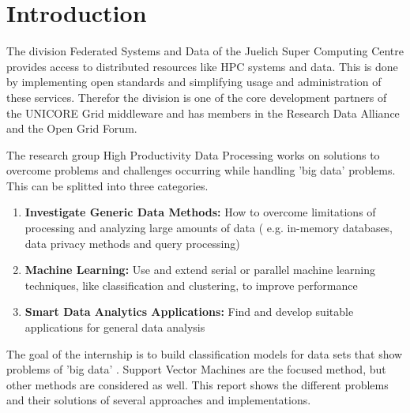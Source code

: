 %

\section{Introduction}

The division Federated Systems and Data of the Juelich Super Computing
Centre provides access to distributed resources like HPC systems and
data. This is done by implementing open standards and simplifying
usage and administration of these services. Therefor the division
is one of the core development partners of the UNICORE Grid middleware
and has members in the Research Data Alliance and the Open Grid Forum.

The research group High Productivity Data Processing works on solutions
to overcome problems and challenges occurring while handling 'big
data' problems. This can be splitted into three categories. 

\begin{enumerate} 	\item{\textbf{Investigate Generic Data Methods:}} How to overcome limitations of processing and analyzing large amounts of data ( e.g. in-memory databases, data privacy methods and query processing) 	\item{\textbf{Machine Learning:}} Use and extend serial or parallel machine learning techniques, like classification and clustering, to improve performance 	\item{\textbf{Smart Data Analytics Applications:}} Find and develop suitable applications for general data analysis 
\end{enumerate}

The goal of the internship is to build classification models for data
sets that show problems of 'big data' . Support Vector Machines are
the focused method, but other methods are considered as well. This
report shows the different problems and their solutions of several
approaches and implementations. %

